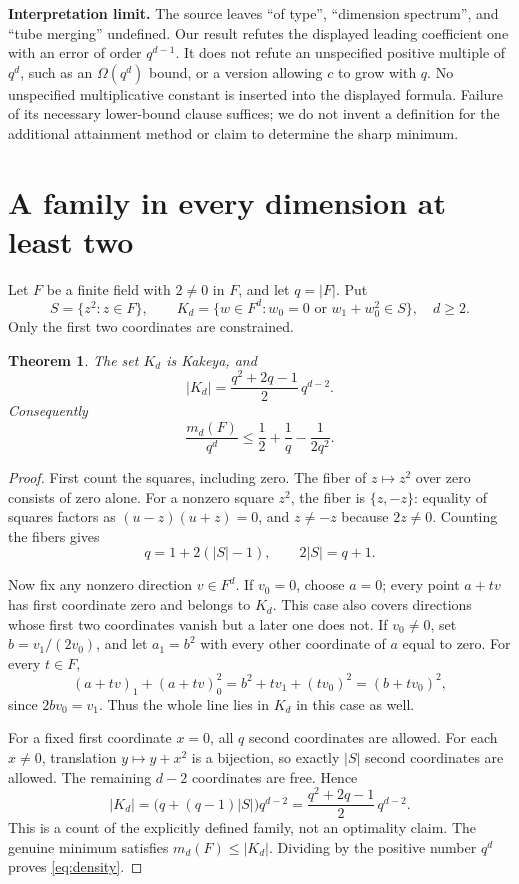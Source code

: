 \documentclass[11pt]{article}
\newtheorem{theorem}{Theorem}
\begin{document}
\textbf{Interpretation limit.} The source leaves ``of type'', ``dimension
spectrum'', and ``tube merging'' undefined. Our result refutes the displayed
leading coefficient one with an error of order $q^{d-1}$. It does not refute
an unspecified positive multiple of $q^d$, such as an $\Omega(q^d)$ bound,
or a version allowing $c$ to grow with $q$. No unspecified multiplicative
constant is inserted into the displayed formula. Failure of its necessary
lower-bound clause suffices; we do not invent a definition for the additional
attainment method or claim to determine the sharp minimum.

\section{A family in every dimension at least two}
Let $F$ be a finite field with $2\neq0$ in $F$, and let $q=|F|$. Put
\[
 S=\{z^2:z\in F\},\qquad
 K_d=\{w\in F^d:w_0=0\text{ or }w_1+w_0^2\in S\},\quad d\geq2.
\]
Only the first two coordinates are constrained.

\begin{theorem}\label{thm:family}
The set $K_d$ is Kakeya, and
\begin{equation}\label{eq:card}
 |K_d|=\frac{q^2+2q-1}{2}\,q^{d-2}.
\end{equation}
Consequently
\begin{equation}\label{eq:density}
 \frac{m_d(F)}{q^d}\leq\frac12+\frac1q-\frac{1}{2q^2}.
\end{equation}
\end{theorem}
\begin{proof}
First count the squares, including zero. The fiber of $z\mapsto z^2$ over
zero consists of zero alone. For a nonzero square $z^2$, the fiber is
$\{z,-z\}$: equality of squares factors as
$(u-z)(u+z)=0$, and $z\neq-z$ because $2z\neq0$. Counting the fibers gives
\[
 q=1+2(|S|-1),\qquad 2|S|=q+1.
\]

Now fix any nonzero direction $v\in F^d$. If $v_0=0$, choose $a=0$; every
point $a+tv$ has first coordinate zero and belongs to $K_d$. This case also
covers directions whose first two coordinates vanish but a later one does not.
If $v_0\neq0$, set $b=v_1/(2v_0)$, and let $a_1=b^2$ with every other
coordinate of $a$ equal to zero. For every $t\in F$,
\[
 (a+tv)_1+(a+tv)_0^2
   =b^2+tv_1+(tv_0)^2=(b+tv_0)^2,
\]
since $2bv_0=v_1$. Thus the whole line lies in $K_d$ in this case as well.

For a fixed first coordinate $x=0$, all $q$ second coordinates are allowed.
For each $x\neq0$, translation $y\mapsto y+x^2$ is a bijection, so exactly
$|S|$ second coordinates are allowed. The remaining $d-2$ coordinates are
free. Hence
\[
 |K_d|=\bigl(q+(q-1)|S|\bigr)q^{d-2}
       =\frac{q^2+2q-1}{2}\,q^{d-2}.
\]
This is a count of the explicitly defined family, not an optimality claim.
The genuine minimum satisfies $m_d(F)\leq|K_d|$. Dividing by the positive
number $q^d$ proves \eqref{eq:density}.
\end{proof}
\end{document}

